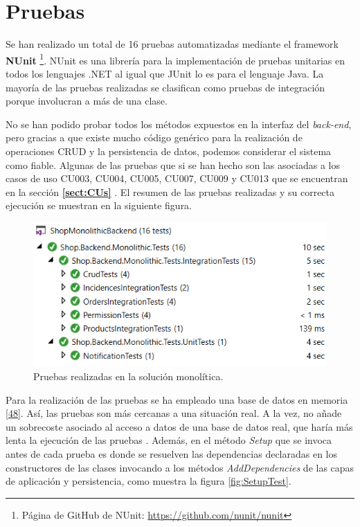 \documentclass[11pt,spanish,listoffigures]{tfgetsinf}
\begin{document}
\section{Pruebas} \label{sect:MonoPruebas}

Se han realizado un total de 16 pruebas automatizadas mediante el framework \textbf{NUnit} \footnote{ Página de GitHub de NUnit: \url{https://github.com/nunit/nunit}}. NUnit es una librería para la implementación de pruebas unitarias en todos los lenguajes .NET al igual que JUnit lo es para el lenguaje Java. La mayoría de las pruebas realizadas se clasifican como pruebas de integración porque involucran a más de una clase. 

No se han podido probar todos los métodos expuestos en la interfaz del \textit{back-end}, pero gracias a que existe mucho código genérico para la realización de operaciones CRUD y la persistencia de datos, podemos considerar el sistema como fiable. Algunas de las pruebas que si se han hecho son las asociadas a los casos de uso CU003, CU004, CU005, CU007, CU009 y CU013 que se encuentran en la sección \textbf{\ref{sect:CUs} }. El resumen de las pruebas realizadas y su correcta ejecución se muestran en la siguiente figura.

\begin{figure}[h]
\centering
\includegraphics[scale=0.8]{Tests}
\caption{Pruebas realizadas en la solución monolítica.}
\end{figure}

Para la realización de las pruebas se ha empleado una base de datos en memoria \hyperlink{page.80}{[48]}. Así, las pruebas son más cercanas a una situación real. A la vez, no añade un sobrecoste asociado al acceso a datos de una base de datos real, que haría más lenta la ejecución de las pruebas . Además, en el método \textit{Setup} que se invoca antes de cada prueba es donde se resuelven las dependencias declaradas en los constructores de las clases invocando a los métodos \textit{AddDependencies} de las capas de aplicación y persistencia, como muestra la figura \ref{fig:SetupTest}. 
\end{document}
